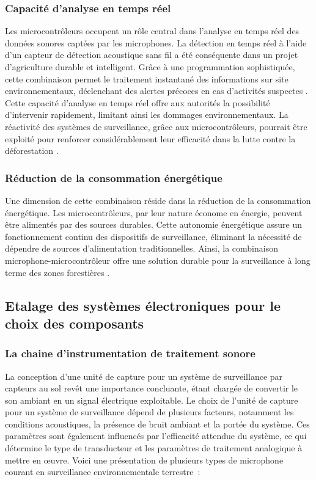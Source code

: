 \subsubsection{Capacité d'analyse en temps réel}
Les microcontrôleurs occupent un rôle central dans l'analyse en temps réel des données sonores captées par les microphones. La détection en temps réel à l'aide d'un capteur de détection acoustique sans fil a été conséquente dans un projet d’agriculture durable et intelligent. Grâce à une programmation sophistiquée, cette combinaison permet le traitement instantané des informations sur site environnementaux, déclenchant des alertes précoces en cas d'activités suspectes \cite{62}. Cette capacité d'analyse en temps réel offre aux autorités la possibilité d'intervenir rapidement, limitant ainsi les dommages environnementaux. La réactivité des systèmes de surveillance, grâce aux microcontrôleurs, pourrait être exploité pour renforcer considérablement leur efficacité dans la lutte contre la déforestation \cite{63}.

\subsubsection{Réduction de la consommation énergétique}
Une dimension de cette combinaison réside dans la réduction de la consommation énergétique. Les microcontrôleurs, par leur nature économe en énergie, peuvent être alimentés par des sources durables. Cette autonomie énergétique assure un fonctionnement continu des dispositifs de surveillance, éliminant la nécessité de dépendre de sources d'alimentation traditionnelles. Ainsi, la combinaison microphone-microcontrôleur offre une solution durable pour la surveillance à long terme des zones forestières \cite{64}.

\subsection{Etalage des systèmes électroniques pour le choix des composants}

\subsubsection{La chaine d’instrumentation de traitement sonore}
La conception d'une unité de capture pour un système de surveillance par capteurs au sol revêt une importance concluante, étant chargée de convertir le son ambiant en un signal électrique exploitable. 
Le choix de l'unité de capture pour un système de surveillance dépend de plusieurs facteurs, notamment les conditions acoustiques, la présence de bruit ambiant et la portée du système\cite{65}. Ces paramètres sont également influencés par l'efficacité attendue du système, ce qui détermine le type de transducteur et les paramètres de traitement analogique à mettre en œuvre.
Voici une présentation de plusieurs types de microphone courant en surveillance environnementale terrestre :

